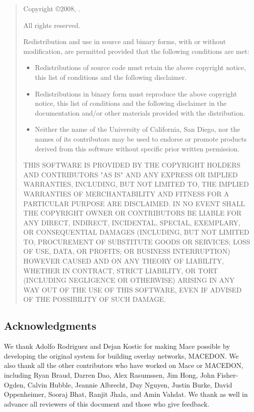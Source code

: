 
\bigskip
\begin{quote}
Copyright \copyright 2008, \authorlist.

All rights reserved.

Redistribution and use in source and binary forms, with or without
modification, are permitted provided that the following conditions are met:

\begin{itemize}
\item Redistributions of source code must retain the above copyright notice, this
  list of conditions and the following disclaimer.
\item Redistributions in binary form must reproduce the above copyright notice,
this list of conditions and the following disclaimer in the documentation
and/or other materials provided with the distribution.
\item Neither the name of the University of California, San Diego, nor the
names of its contributors may be used to endorse or promote products derived
from this software without specific prior written permission.
\end{itemize}

THIS SOFTWARE IS PROVIDED BY THE COPYRIGHT HOLDERS AND CONTRIBUTORS "AS IS" AND
ANY EXPRESS OR IMPLIED WARRANTIES, INCLUDING, BUT NOT LIMITED TO, THE IMPLIED
WARRANTIES OF MERCHANTABILITY AND FITNESS FOR A PARTICULAR PURPOSE ARE
DISCLAIMED. IN NO EVENT SHALL THE COPYRIGHT OWNER OR CONTRIBUTORS BE LIABLE FOR
ANY DIRECT, INDIRECT, INCIDENTAL, SPECIAL, EXEMPLARY, OR CONSEQUENTIAL DAMAGES
(INCLUDING, BUT NOT LIMITED TO, PROCUREMENT OF SUBSTITUTE GOODS OR SERVICES;
LOSS OF USE, DATA, OR PROFITS; OR BUSINESS INTERRUPTION) HOWEVER CAUSED AND ON
ANY THEORY OF LIABILITY, WHETHER IN CONTRACT, STRICT LIABILITY, OR TORT
(INCLUDING NEGLIGENCE OR OTHERWISE) ARISING IN ANY WAY OUT OF THE USE OF THIS
SOFTWARE, EVEN IF ADVISED OF THE POSSIBILITY OF SUCH DAMAGE.
\end{quote}

\subsection{Acknowledgments}
\label{sec:acknowledgements}

We thank Adolfo Rodriguez and Dejan Kostic for making Mace possible by
developing the original system for building overlay networks, MACEDON.
We also thank all the other contributors who have worked on Mace or
MACEDON, including Ryan Braud, Darren Dao, Alex Rasumssen, Jim Hong,
John Fisher-Ogden, Calvin Hubble, Jeannie Albrecht, Duy Nguyen, Justin
Burke, David Oppenheimer, Sooraj Bhat, Ranjit Jhala, and Amin Vahdat.
We thank as well in advance all reviewers of this document and those who
give feedback.

